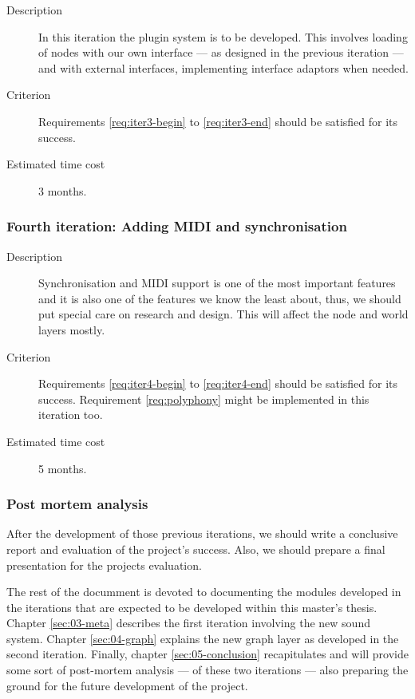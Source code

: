 \begin{description}
\item[Description] In this iteration the plugin system is to be
  developed. This involves loading of nodes with our own interface ---
  as designed in the previous iteration --- and with external
  interfaces, implementing interface adaptors when needed.

\item[Criterion] Requirements \ref{req:iter3-begin} to
  \ref{req:iter3-end} should be satisfied for its success.

\item[Estimated time cost] 3 months.
\end{description}
\subsubsection{Fourth iteration: Adding MIDI and synchronisation}

\begin{description}
\item[Description] Synchronisation and MIDI support is one of the most
  important features and it is also one of the features we know the
  least about, thus, we should put special care on research and
  design. This will affect the node and world layers mostly.

\item[Criterion] Requirements \ref{req:iter4-begin} to
  \ref{req:iter4-end} should be satisfied for its success. Requirement
  \ref{req:polyphony} might be implemented in this iteration too.

\item[Estimated time cost] 5 months.
\end{description}

\subsubsection{Post mortem analysis}

After the development of those previous iterations, we should write a
conclusive report and evaluation of the project's success. Also, we
should prepare a final presentation for the projects evaluation.

\begin{mynote}
  The rest of the documment is devoted to documenting the modules
  developed in the iterations that are expected to be developed within
  this master's thesis. Chapter \ref{sec:03-meta} describes the first
  iteration involving the new sound system. Chapter \ref{sec:04-graph}
  explains the new graph layer as developed in the second
  iteration. Finally, chapter \ref{sec:05-conclusion} recapitulates
  and will provide some sort of post-mortem analysis --- of these two
  iterations --- also preparing the ground for the future development
  of the project.
\end{mynote}

